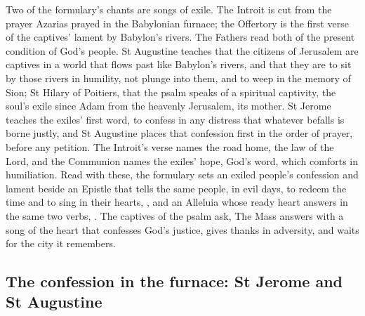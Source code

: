 \label{sec:songs-of-sion}

Two of the formulary's chants are songs of exile. The Introit is cut from the
prayer Azarias prayed in the Babylonian furnace; the Offertory is the first
verse of the captives' lament by Babylon's rivers. The Fathers read both of the
present condition of God's people. St Augustine teaches that the citizens of
Jerusalem are captives in a world that flows past like Babylon's rivers, and
that they are to sit by those rivers in humility, not plunge into them, and to
weep in the memory of Sion; St Hilary of Poitiers, that the psalm speaks of a
spiritual captivity, the soul's exile since Adam from the heavenly Jerusalem,
its mother. St Jerome teaches the exiles' first word, to confess in any distress
that whatever befalls is borne justly, and St Augustine places that confession
first in the order of prayer, before any petition. The Introit's verse names
the road home, the law of the Lord, and the Communion names the exiles' hope,
God's word, which comforts in humiliation. Read with these, the formulary sets
an exiled people's confession and lament beside an Epistle that tells the same
people, in evil days, to redeem the time and to sing in their hearts,
, and an Alleluia whose ready heart answers in
the same two verbs, . The captives of the psalm ask,
 The Mass answers
with a song of the heart that confesses God's justice, gives thanks in
adversity, and waits for the city it remembers.

\subsection{The confession in the furnace: St Jerome and St Augustine}

